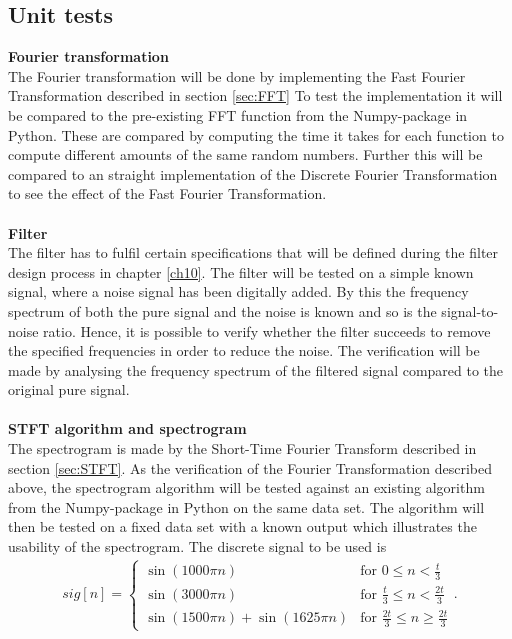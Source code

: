 \subsection{Unit tests} 
\textbf{Fourier transformation} \\
The Fourier transformation will be done by implementing the Fast Fourier Transformation described in section \ref{sec:FFT} 
To test the implementation it will be compared to the pre-existing FFT function from the Numpy-package in Python. These are compared by computing the time it takes for each function to compute different amounts of the same random numbers. Further this will be compared to an straight  implementation of the Discrete Fourier Transformation to see the effect of the Fast Fourier Transformation.\\
\\
\textbf{Filter}\\
The filter has to fulfil certain specifications that will be defined during the filter design process in chapter \ref{ch10}. The filter will be tested on a simple known signal, where a noise signal has been digitally added. By this the frequency spectrum of both the pure signal and the noise is known and so is the signal-to-noise ratio. Hence, it is possible to verify whether the filter succeeds to remove the specified frequencies in order to reduce the noise. The verification will be made by analysing the frequency spectrum of the filtered signal compared to the original pure signal. \\
\\
\textbf{STFT algorithm and spectrogram}\label{sec:STFT_spec}\\
The spectrogram is made by the Short-Time Fourier Transform described in section \ref{sec:STFT}. As the verification of the Fourier Transformation described above, the spectrogram algorithm will be tested against an existing algorithm from the Numpy-package in Python on the same data set. The algorithm will then be tested on a fixed data set with a known output which illustrates the usability of the spectrogram. The discrete signal to be used is
\begin{align}\label{eq:SPECTROsignal}
sig[n]=\begin{cases}\sin(1000\pi n)&\text{for }0\leq n<\frac{t}{3}\\
\sin(3000\pi n)&\text{for }\frac{t}{3}\leq n < \frac{2t}{3}\\
\sin(1500\pi n)+\sin(1625\pi n)&\text{for }\frac{2t}{3}\leq n\geq\frac{2t}{3}
\end{cases}.
\end{align}
